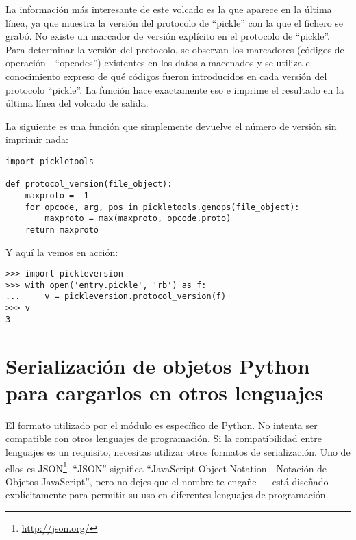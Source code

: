 La información más interesante de este volcado es la que aparece en la última línea, ya que muestra la versión del protocolo de ``pickle'' con la que el fichero se grabó. No existe un marcador de versión explícito en el protocolo de ``pickle''. Para determinar la versión del protocolo, se observan los marcadores (códigos de operación - ``opcodes'') existentes en los datos almacenados y se utiliza el conocimiento expreso de qué códigos fueron introducidos en cada versión del protocolo ``pickle''. La función  hace exactamente eso e imprime el resultado en la última línea del volcado de salida.

La siguiente es una función que simplemente devuelve el número de versión sin imprimir nada:

\noindent\begin{minipage}{\textwidth}
\begin{lstlisting}[mathescape=True]
import pickletools

def protocol_version(file_object):
    maxproto = -1
    for opcode, arg, pos in pickletools.genops(file_object):
        maxproto = max(maxproto, opcode.proto)
    return maxproto
\end{lstlisting}
\end{minipage}

Y aquí la vemos en acción:

\noindent\begin{minipage}{\textwidth}
\begin{lstlisting}[mathescape=True]
>>> import pickleversion
>>> with open('entry.pickle', 'rb') as f:
...     v = pickleversion.protocol_version(f)
>>> v
3
\end{lstlisting}
\end{minipage}

\section{Serialización de objetos Python para cargarlos en otros lenguajes}

El formato utilizado por el módulo  es específico de Python. No intenta ser compatible con otros lenguajes de programación. Si la compatibilidad entre lenguajes es un requisito, necesitas utilizar otros formatos de serialización. Uno de ellos es JSON\footnote{\href{http://json.org/}{http://json.org/}}. ``JSON'' significa ``JavaScript Object Notation - Notación de Objetos JavaScript'', pero no dejes que el nombre te engañe --- está diseñado explícitamente para permitir su uso en diferentes lenguajes de programación.

